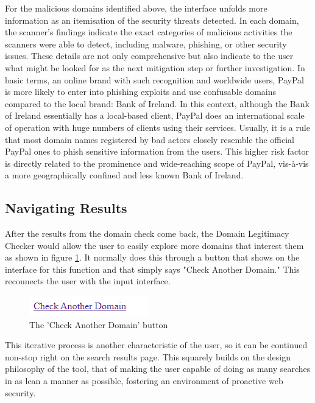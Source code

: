 For the malicious domains identified above, the interface unfolds more information as an itemisation of the security threats detected. In each domain, the scanner's findings indicate the exact categories of malicious activities the scanners were able to detect, including malware, phishing, or other security issues. These details are not only comprehensive but also indicate to the user what might be looked for as the next mitigation step or further investigation. In basic terms, an online brand with such recognition and worldwide users, PayPal is more likely to enter into phishing exploits and use confusable domains compared to the local brand: Bank of Ireland. In this context, although the Bank of Ireland essentially has a local-based client, PayPal does an international scale of operation with huge numbers of clients using their services. Usually, it is a rule that most domain names registered by bad actors closely resemble the official PayPal ones to phish sensitive information from the users. This higher risk factor is directly related to the prominence and wide-reaching scope of PayPal, vis-à-vis a more geographically confined and less known Bank of Ireland.

\subsection{Navigating Results}

After the results from the domain check come back, the Domain Legitimacy Checker would allow the user to easily explore more domains that interest them as shown in figure \ref{fig:sss}. It normally does this through a button that shows on the interface for this function and that simply says "Check Another Domain." This reconnects the user with the input interface.

\begin{figure}[H]
    \centering
    \includegraphics[width=0.3\linewidth]{project/ii.png}
    \caption{The 'Check Another Domain' button}
    \label{fig:sss}
\end{figure}

This iterative process is another characteristic of the user, so it can be continued non-stop right on the search results page. This squarely builds on the design philosophy of the tool, that of making the user capable of doing as many searches in as lean a manner as possible, fostering an environment of proactive web security.




